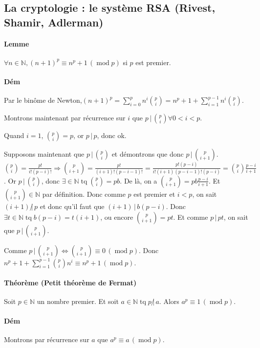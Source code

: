 \documentclass{article}
\DeclareMathOperator{\tq}{\text{ tq }}
\DeclareMathOperator{\modulo}{mod}
\newcommand{\cmod}[1]{\, (\modulo #1)}
\begin{document}
		\subsection{La cryptologie : le système RSA (Rivest, Shamir, Adlerman)}

			\paragraph{Lemme} $\forall n \in \mathbb N, (n+1)^p \equiv n^p + 1 \cmod p$ si $p$ est premier.

			\paragraph{Dém} Par le binôme de Newton,$(n+1)^p = \sum_{i=0}^p n^i\binom pi = n^p + 1 + \sum_{i=1}^{p-1}n^i\binom pi$.

			Montrons maintenant par récurrence sur $i$ que $p \, | \, \binom pi \forall 0 < i < p$.

			Quand $i = 1$, $\binom pi = p$, or $p \, | \, p$, donc ok.

			Supposons maintenant que $p \, | \, \binom pi$ et démontrons que donc $p \, | \, \binom p{i+1}$. $\binom p{i} = \frac {p!}{i!(p-i)!} \Rightarrow \binom p{i+1} =
			\frac {p!}{(i+1)!(p-i-1)!} = \frac {p!(p-i)}{i!(i+1)(p-i-1)!(p-i)} = \binom pi \frac {p-i}{i+1}$. Or $p \, | \, \binom pi$, donc $\exists  \in \mathbb N \tq
			\binom pi = pb$. De là, on a $\binom p{i+1} = pb\frac {p-i}{i+1}$. Et $\binom p{i+1} \in \mathbb N$ par définition. Donc comme $p$ est premier et $i < p$,
			on sait $(i+1) \, \not | \, p$ et donc qu'il faut que $(i+1) \, | \, b(p-i)$. Donc $\exists t \in \mathbb N \tq b(p-i) = t(i+1)$, ou encore $\binom p{i+1} = pt$.
			Et comme $p \, | \, pt$, on sait que $p \, | \, \binom p{i+1}$.

			Comme $p \, | \, \binom p{i+1} \Leftrightarrow \binom p{i+1} \equiv 0 \cmod p$. Donc $n^p + 1 + \sum_{i=1}^{p-1}\binom pi n^i \equiv n^p + 1 \cmod p$.

			\paragraph{Théorème (Petit théorème de Fermat)} Soit $p \in \mathbb N$ un nombre premier. Et soit $a \in \mathbb N \tq p \, \not | \, a$.
			Alors $a^p \equiv 1 \cmod p$.

			\paragraph{Dém} Montrons par récurrence sur $a$ que $a^p \equiv a \cmod p$.
\end{document}
